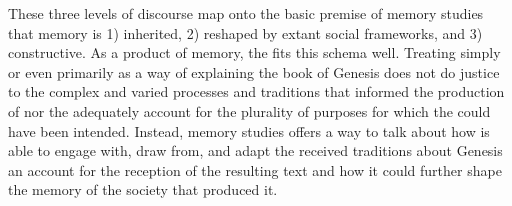 These three levels of discourse map onto the basic premise of memory studies that memory is 1) inherited, 2) reshaped by extant social frameworks, and 3) constructive. As a product of memory, the \ga fits this schema well. Treating \ga simply or even primarily as a way of explaining the book of Genesis does not do justice to the complex and varied processes and traditions that informed the production of \ga nor the adequately account for the plurality of purposes for which the \ga could have been intended. Instead, memory studies offers a way to talk about how \ga is able to engage with, draw from, and adapt the received traditions about Genesis an account for the reception of the resulting text and how it could further shape the memory of the society that produced it.